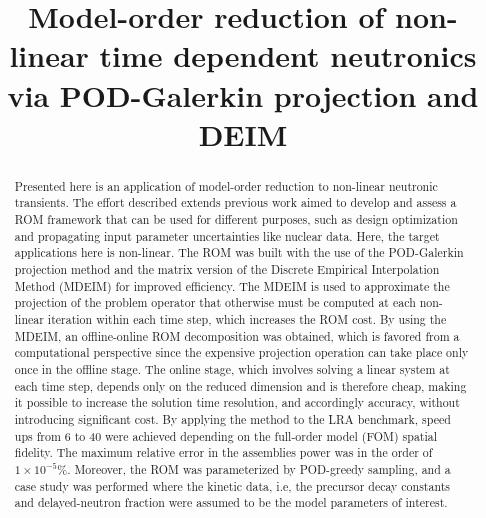 \documentclass[]{interact}
\theoremstyle{plain}%
\theoremstyle{definition}
\theoremstyle{remark}
\begin{document}

\title{Model-order reduction of non-linear time dependent neutronics via POD-Galerkin projection and DEIM}
\author{
}

\maketitle
\begin{abstract}
Presented here is an application of model-order reduction to non-linear neutronic transients.
The effort described extends previous work\cite{elzohery2021modeling} aimed to develop and assess a ROM framework that can be used for different purposes, such as design optimization and propagating input parameter uncertainties like nuclear data.
Here, the target applications here is non-linear.
The ROM was built with the use of the POD-Galerkin projection method and the matrix version of the Discrete Empirical Interpolation Method (MDEIM) for improved efficiency.
The MDEIM is used to approximate the projection of the problem operator that otherwise must be computed at each non-linear iteration within each time step, which increases the ROM cost.
By using the MDEIM, an offline-online ROM decomposition was obtained, which is favored from a computational perspective since the expensive projection operation can take place only once in the offline stage.
The online stage, which involves solving a linear system  at each time step, depends only on the reduced dimension and is therefore cheap, making it possible to increase the solution time resolution, and accordingly accuracy, without introducing significant cost.
By applying the method to the LRA benchmark, speed ups from 6 to 40 were achieved depending on the full-order model (FOM) spatial fidelity.
The maximum relative error in the assemblies power was in the order of $1\times10^{-5}$\%.
Moreover, the ROM was parameterized by POD-greedy sampling, and a case study was performed where the kinetic data, i.e, the precursor decay constants and delayed-neutron fraction were assumed to be the model parameters of interest.

\end{abstract}
\end{document}
